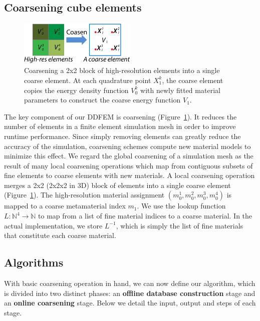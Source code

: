 \subsection{Coarsening cube elements}
\begin{figure}[ht]
	\centering	
	\includegraphics[width=0.5\textwidth]{images/coarsen.pdf}
	\caption{Coarsening a 2x2 block of high-resolution elements into a single coarse element.
		At each quadrature point $X_1^k$, the coarse element copies the energy density function $V_0^k$ with newly fitted material parameters to construct the coarse energy function
		$V_1$.}
	\label{fig:coarsen}
\end{figure}
The key component of our DDFEM is coarsening (Figure~\ref{fig:coarsen}). It reduces the number of elements in a finite element simulation mesh in order to improve runtime performance. Since simply removing elements can greatly reduce the accuracy of the simulation, coarsening schemes compute new material models to minimize this effect.
We regard the global coarsening of a simulation mesh as the result of many local coarsening operations which map from contiguous subsets of fine elements to coarse elements with new materials.
A local coarsening operation merges a 2x2 (2x2x2 in 3D) block of elements into a single coarse element (Figure~\ref{fig:coarsen}).
The high-resolution material assignment $(m_0^1,m_0^2,m_0^3,m_0^4)$ is mapped to a coarse metamaterial index $m_1$. We use the lookup function $L:\mathbb{N}^4\rightarrow \mathbb{N}$ to map from a list of fine material indices to a coarse material. In the actual implementation, we store $L^{-1}$, which is simply the list of fine materials that constitute each coarse material.

\subsection{Algorithms}
With basic coarsening operation in hand, we can now define our algorithm, which is divided into two distinct phases: an \textbf{offline database construction} stage and an \textbf{online coarsening} stage.
Below we detail the input, output and steps of each stage.

\noindent\hrulefill


